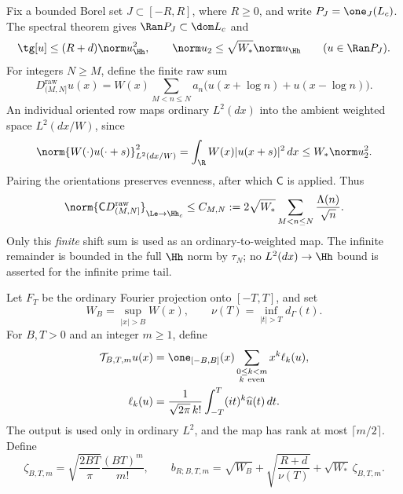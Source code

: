 Fix a bounded Borel set $J\subset[-R,R]$, where $R\ge0$, and write
$P_J=\one_J(L_c)$. The spectral theorem gives
$\Ran P_J\subset\dom L_c$ and
\begin{equation}\label{vfourB:window-energy}
 \tg[u]\le(R+d)\norm u_{\Hh}^2,
 \qquad \norm u_2\le\sqrt{W_*}\norm u_{\Hh}
 \qquad(u\in\Ran P_J).
\end{equation}
For integers $N\ge M$, define the finite raw sum
\[
 D_{(M,N]}^{\mathrm{raw}}u(x)
 =W(x)\sum_{M<n\le N}a_n
       \bigl(u(x+\log n)+u(x-\log n)\bigr).
\]
An individual oriented row maps ordinary $L^2(dx)$ into the ambient
weighted space $L^2(dx/W)$, since
\[
 \norm{W(\cdot)u(\cdot+s)}_{L^2(dx/W)}^2
 =\int_{\R}W(x)|u(x+s)|^2\,dx\le W_*\norm u_2^2.
\]
Pairing the orientations preserves evenness, after which $\mathsf C$ is
applied. Thus
\begin{equation}\label{vfourB:finite-shift-cap}
 \norm{\mathsf C D_{(M,N]}^{\mathrm{raw}}}
       _{\Le\to\Hh_c}
 \le C_{M,N}:=2\sqrt{W_*}\sum_{M<n\le N}\frac{\Lambda(n)}{\sqrt n}.
\end{equation}
Only this \emph{finite} shift sum is used as an ordinary-to-weighted map.
The infinite remainder is bounded in the full $\Hh$ norm by $\tau_N$;
no $L^2(dx)\to\Hh$ bound is asserted for the infinite prime tail.

Let $F_T$ be the ordinary Fourier projection onto $[-T,T]$, and set
\[
 W_B=\sup_{|x|>B}W(x),\qquad
 \nu(T)=\inf_{|t|>T}d_\Gamma(t).
\]
For $B,T>0$ and an integer $m\ge1$, define
\begin{equation}\label{vfourB:taylor-map}
 \begin{split}
 \mathcal T_{B,T,m}u(x)
 &=\one_{[-B,B]}(x)\sum_{\substack{0\le k<m\\k\ \mathrm{even}}}
       x^k\ell_k(u),\\
 \ell_k(u)&=\frac{1}{\sqrt{2\pi}\,k!}
            \int_{-T}^T(it)^k\widehat u(t)\,dt.
 \end{split}
\end{equation}
The output is used only in ordinary $L^2$, and the map has rank at most
$\lceil m/2\rceil$. Define
\begin{equation}\label{vfourB:error-parameters}
 \zeta_{B,T,m}=\sqrt{\frac{2BT}{\pi}}\frac{(BT)^m}{m!},\qquad
 b_{R;B,T,m}=\sqrt{W_B}
       +\sqrt{\frac{R+d}{\nu(T)}}+\sqrt{W_*}\,\zeta_{B,T,m}.
\end{equation}

